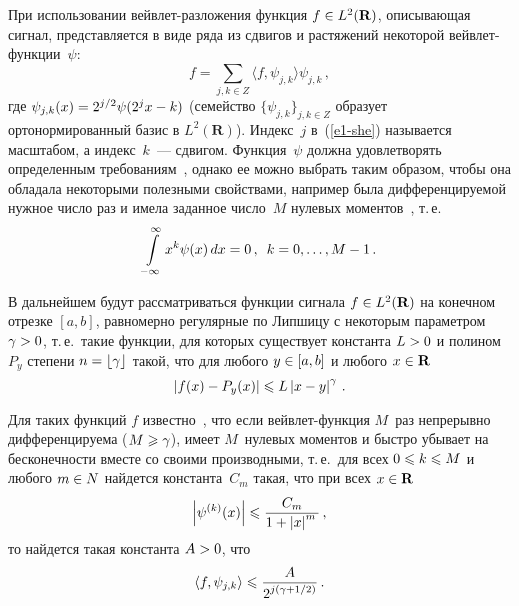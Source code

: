 \begin{multicols}{2}
При использовании вейв\-лет-раз\-ло\-же\-ния функция $f\hm\in L^2(\mathbf{R})$, описывающая сигнал, 
представляется в виде ряда из сдвигов и растяжений некоторой вейв\-лет-функ\-ции~$\psi$:
\begin{equation}
f=\sum\limits_{j,k\in Z}\langle f,\psi_{j,k}\rangle\psi_{j,k}\,,\label{e1-she}
\end{equation}
где $\psi_{j,k}(x)\hm=2^{j/2}\psi(2^jx-k)$ (семейство $\{\psi_{j,k}\}_{j,k\in Z}$ образует ортонормированный 
базис в $L^2(\mathbf{R})$). Индекс~$j$ в~(\ref{e1-she}) называется масштабом, а индекс~$k$~--- сдвигом. 
Функция~$\psi$ должна удовлетворять определенным требованиям~\cite{13-she}, однако ее можно выбрать таким образом, 
чтобы она обладала некоторыми полезными свойствами, например была дифференцируемой нужное число раз и имела заданное 
число~$M$ нулевых моментов~\cite{13-she}, т.\,е.\
$$
\int\limits_{-\infty}^{\infty}x^k\psi(x)\,dx=0\,,\enskip k=0,\ldots,M-1\,.
$$

В дальнейшем будут рассматриваться функции сигнала $f\hm\in L^2(\mathbf{R})$ на конечном отрезке $[a,b]$, 
равномерно регулярные по Липшицу с некоторым параметром $\gamma\hm>0$, т.\,е.\ такие 
функции, для которых существует константа $L\hm>0$ и полином $P_y$ степени $n\hm=\lfloor\gamma\rfloor$ такой, 
что для любого $y\hm\in[a,b]$ и любого $x\hm\in\mathbf{R}$
$$
\left\vert f(x)-P_y(x)\right\vert\leqslant L\left\vert x-y\right\vert^\gamma\,.
$$

Для таких функций $f$ известно~\cite{14-she}, что если вейв\-лет-функ\-ция $M$~раз непрерывно дифференцируема ($M\hm\geqslant\gamma$), 
имеет $M$~нулевых моментов и быст\-ро убывает на бесконечности вместе со своими производными, т.\,е.\
для всех $0\hm\leqslant k \hm\leqslant M$ и любого $m\hm\in N$ найдется константа~$C_m$ такая, что при всех $x\hm\in\mathbf{R}$
$$
\left\vert\psi^{(k)}(x)\right\vert\leqslant\displaystyle\frac{\displaystyle C_m\mathstrut}{\displaystyle 1+\left\vert x\right\vert^m\mathstrut}\,,
$$
то найдется такая константа $A\hm>0$, что
\begin{equation}
\langle f,\psi_{j,k}\rangle\leqslant\displaystyle\frac{\displaystyle A\mathstrut}{\displaystyle 2^{j\left(\gamma+{1}/{2}\right)}\mathstrut}\,.\label{e2-she}
\end{equation}


\end{multicols}
